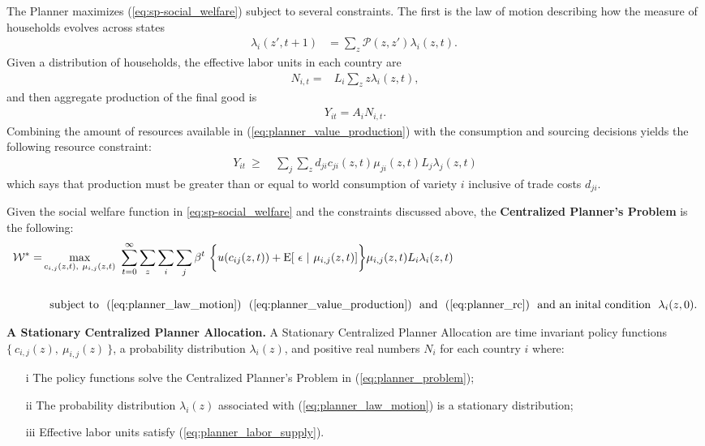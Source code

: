 \documentclass[12pt,pdftex]{article}
\begin{document}
\begin{onehalfspacing}
The Planner maximizes (\ref{eq:sp-social_welfare}) subject to several constraints. The first is the law of motion describing how the measure of households evolves across states
\begin{align}
\lambda_{i}(z', t+1)  & =   \sum_{z} \mathcal{P}(z, z') \lambda_{i}(z,  t).  \  \label{eq:planner_law_motion}
\end{align}
Given a distribution of households, the effective labor units in each country are
\begin{align}
N_{i,t} =&  L_i \sum_{z} z \lambda_{i}(z, t),
\label{eq:planner_labor_supply}
\end{align}
and then aggregate production of the final good is
\begin{align}
Y_{it} = A_i N_{i,t}.
\label{eq:planner_value_production}
\end{align}
Combining the amount of resources available in (\ref{eq:planner_value_production}) with the consumption and sourcing decisions yields the following resource constraint:
\begin{align}
Y_{it}\  \geq \ & \sum_{j} \sum_{z} d_{ji} c_{ji}(z, t) \mu_{ji}(z,t) L_{j}\lambda_{j}(z, t)
\label{eq:planner_rc}
\end{align}
which says that production must be greater than or equal to world consumption of variety $i$ inclusive of trade costs $d_{ji}$.

Given the social welfare function in \ref{eq:sp-social_welfare} and the constraints discussed above, the \textbf{Centralized Planner's Problem} is the following:
{\small
\begin{align}
\mathcal{W}^{*} = & \max\limits_{c_{i,j}(z, t),\ \mu_{i,j}(z, t)} \ \sum_{t=0}^{\infty}  \sum\limits_{z} \sum_{i} \sum_{j} \beta^{t} \  \bigg \{  u(c_{ij}(z, t) ) + \mathrm{E}[ \ \epsilon \ | \ \mu_{i,j}(z,t) ] \bigg \}\mu_{i,j}(z,t) L_{i} \lambda_{i}(z, t) \ \ \nonumber \\
\nonumber \\
& \ \ \mbox{subject to} \ \ (\ref{eq:planner_law_motion}) \ \ (\ref{eq:planner_value_production}) \ \ \mbox{and} \ \ (\ref{eq:planner_rc}) \ \ \mbox{and an inital condition} \ \ \lambda_i(z, 0).
\label{eq:planner_problem}
\end{align}
}

\textbf{A Stationary Centralized Planner Allocation.}  A Stationary Centralized Planner Allocation are time invariant policy functions $\{\ c_{i,j}(z),\ \mu_{i,j}(z) \ \}$, a probability distribution $\lambda_{i}(z)$, and positive real numbers $N_{i}$ for each country $i$ where:
\begin{itemize}
\item[i] The policy functions solve the Centralized Planner's Problem in (\ref{eq:planner_problem});
\item[ii] The probability distribution $\lambda_{i}(z)$ associated with (\ref{eq:planner_law_motion}) is a stationary distribution;
\item[iii] Effective labor units satisfy (\ref{eq:planner_labor_supply}).
\end{itemize}



\end{onehalfspacing}
\end{document}

